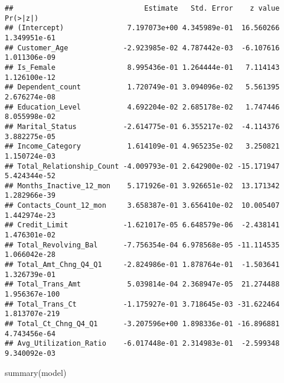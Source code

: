 \documentclass[
]{article}
\newenvironment{Shaded}{\begin{snugshade}}{\end{snugshade}}
\newcommand{\FunctionTok}[1]{\textcolor[rgb]{0.00,0.00,0.00}{#1}}
\newcommand{\NormalTok}[1]{#1}
\begin{document}
\begin{verbatim}
##                               Estimate   Std. Error    z value      Pr(>|z|)
## (Intercept)               7.197073e+00 4.345989e-01  16.560266  1.349951e-61
## Customer_Age             -2.923985e-02 4.787442e-03  -6.107616  1.011306e-09
## Is_Female                 8.995436e-01 1.264444e-01   7.114143  1.126100e-12
## Dependent_count           1.720749e-01 3.094096e-02   5.561395  2.676274e-08
## Education_Level           4.692204e-02 2.685178e-02   1.747446  8.055998e-02
## Marital_Status           -2.614775e-01 6.355217e-02  -4.114376  3.882275e-05
## Income_Category           1.614109e-01 4.965235e-02   3.250821  1.150724e-03
## Total_Relationship_Count -4.009793e-01 2.642900e-02 -15.171947  5.424344e-52
## Months_Inactive_12_mon    5.171926e-01 3.926651e-02  13.171342  1.282966e-39
## Contacts_Count_12_mon     3.658387e-01 3.656410e-02  10.005407  1.442974e-23
## Credit_Limit             -1.621017e-05 6.648579e-06  -2.438141  1.476301e-02
## Total_Revolving_Bal      -7.756354e-04 6.978568e-05 -11.114535  1.066042e-28
## Total_Amt_Chng_Q4_Q1     -2.824986e-01 1.878764e-01  -1.503641  1.326739e-01
## Total_Trans_Amt           5.039814e-04 2.368947e-05  21.274488 1.956367e-100
## Total_Trans_Ct           -1.175927e-01 3.718645e-03 -31.622464 1.813707e-219
## Total_Ct_Chng_Q4_Q1      -3.207596e+00 1.898336e-01 -16.896881  4.743456e-64
## Avg_Utilization_Ratio    -6.017448e-01 2.314983e-01  -2.599348  9.340092e-03
\end{verbatim}

\begin{Shaded}
\begin{Highlighting}[]
\FunctionTok{summary}\NormalTok{(model)}
\end{Highlighting}
\end{Shaded}
\end{document}
